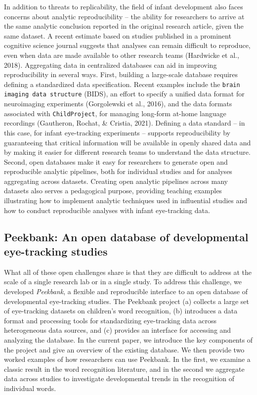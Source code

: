 \documentclass[
  english,
  man,floatsintext]{apa6}
\begin{document}
In addition to threats to replicability, the field of infant development also faces concerns about analytic reproducibility -- the ability for researchers to arrive at the same analytic conclusion reported in the original research article, given the same dataset.
A recent estimate based on studies published in a prominent cognitive science journal suggests that analyses can remain difficult to reproduce, even when data are made available to other research teams (Hardwicke et al., 2018).
Aggregating data in centralized databases can aid in improving reproducibility in several ways.
First, building a large-scale database requires defining a standardized data specification.
Recent examples include the \texttt{brain imaging data structure} (BIDS), an effort to specify a unified data format for neuroimaging experiments (Gorgolewski et al., 2016), and the data formats associated with \texttt{ChildProject}, for managing long-form at-home language recordings (Gautheron, Rochat, \& Cristia, 2021).
Defining a data standard -- in this case, for infant eye-tracking experiments -- supports reproducibility by guaranteeing that critical information will be available in openly shared data and by making it easier for different research teams to understand the data structure.
Second, open databases make it easy for researchers to generate open and reproducible analytic pipelines, both for individual studies and for analyses aggregating across datasets.
Creating open analytic pipelines across many datasets also serves a pedagogical purpose, providing teaching examples illustrating how to implement analytic techniques used in influential studies and how to conduct reproducible analyses with infant eye-tracking data.

\hypertarget{peekbank-an-open-database-of-developmental-eye-tracking-studies}{%
\subsection{Peekbank: An open database of developmental eye-tracking studies}\label{peekbank-an-open-database-of-developmental-eye-tracking-studies}}

What all of these open challenges share is that they are difficult to address at the scale of a single research lab or in a single study.
To address this challenge, we developed \emph{Peekbank}, a flexible and reproducible interface to an open database of developmental eye-tracking studies.
The Peekbank project (a) collects a large set of eye-tracking datasets on children's word recognition, (b) introduces a data format and processing tools for standardizing eye-tracking data across heterogeneous data sources, and (c) provides an interface for accessing and analyzing the database.
In the current paper, we introduce the key components of the project and give an overview of the existing database.
We then provide two worked examples of how researchers can use Peekbank. In the first, we examine a classic result in the word recognition literature, and in the second we aggregate data across studies to investigate developmental trends in the recognition of individual words.
\end{document}
